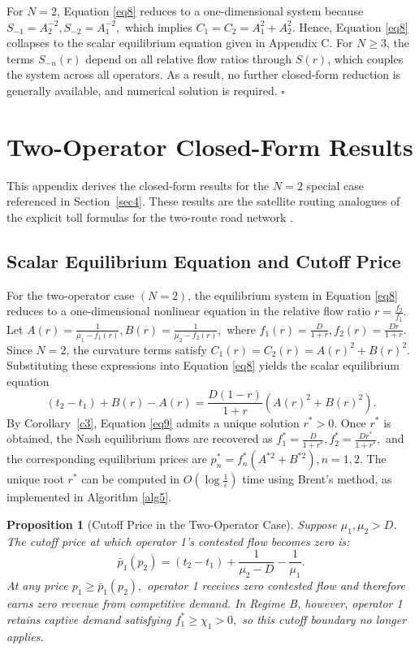 \documentclass[review,3p,authoryear]{elsarticle}
\newtheorem{proposition}[theorem]{Proposition}
\begin{document}
For $N=2$, Equation \eqref{eq8} reduces to a one-dimensional system because $S_{-1}=A_{2}^{-2},S_{-2}=A_{1}^{-2},$ which implies $C_{1}=C_{2}=A_{1}^{2}+A_{2}^{2}.$ Hence, Equation \eqref{eq8} collapses to the scalar equilibrium equation given in Appendix C. For $N{\ge}3$, the terms $S_{-n}(r)$ depend on all relative flow ratios through $S(r)$, which couples the system across all operators. As a result, no further closed-form reduction is generally available, and numerical solution is required. $\ensuremath{\square}$

\section{Two-Operator Closed-Form Results}

This appendix derives the closed-form results for the $N = 2$ special case referenced in Section~\ref{sec4}. These results are the satellite routing analogues of the explicit toll formulas for the two-route road network \cite{Pigou1920, yang2004multi}.

\subsection{Scalar Equilibrium Equation and Cutoff Price}

For the two-operator case $\left(N = 2\right)$, the equilibrium system in Equation \eqref{eq8} reduces to a one-dimensional nonlinear equation in the relative flow ratio $r=\frac{f_{2}}{f_{1}}.$ Let $A(r)=\frac{1}{{\mu}_{1}-f_{1}(r)},B(r)=\frac{1}{{\mu}_{2}-f_{2}(r)},$ where $f_{1}(r)=\frac{D}{1+r},f_{2}(r)=\frac{Dr}{1+r}.$ Since $N=2$, the curvature terms satisfy $C_{1}(r)=C_{2}(r)=A(r)^{2}+B(r)^{2}.$ Substituting these expressions into Equation \eqref{eq8} yields the scalar equilibrium equation
\begin{equation}
    (t_2 - t_1) + B(r) - A(r) = \frac{D(1-r)}{1+r} (A(r)^{2} + B(r)^{2}).
    \label{eq9}
\end{equation}
By Corollary~\ref{c3}, Equation \eqref{eq9} admits a unique solution $r^{*}>0$. Once $r^{*}$ is obtained, the Nash equilibrium flows are recovered as $f_{1}^{*}=\frac{D}{1+r^{*}},f_{2}^{*}=\frac{Dr^{*}}{1+r^{*}},$ and the corresponding equilibrium prices are $p_{n}^{*}=f_{n}^{*}(A^{*2}+B^{*2}),n=1,2.$ The unique root $r^{*}$ can be computed in $O(\log\frac{1}{{\varepsilon}})$ time using Brent's method, as implemented in Algorithm \ref{alg5}.

\begin{proposition}[Cutoff Price in the Two-Operator Case]\label{p1}
Suppose ${\mu}_{1},{\mu}_{2}>D$. The cutoff price at which operator 1's contested flow becomes zero is:
\begin{equation}
\bar{p}_{1}(p_{2})= (t_2 - t_1) + \frac{1}{{\mu}_{2}-D} - \frac{1}{{\mu}_{1}}.
\end{equation}
At any price $p_{1}{\ge}\bar{p}_{1}(p_{2}),$ operator 1 receives zero contested flow and therefore earns zero revenue from competitive demand. In Regime B, however, operator 1 retains captive demand satisfying $f_{1}^{*}{\ge}{\chi}_{1}>0,$ so this cutoff boundary no longer applies.
\end{proposition}
\end{document}

